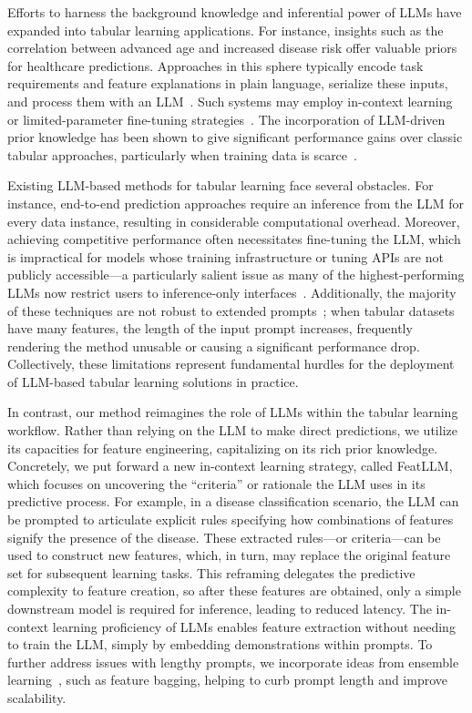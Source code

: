 Efforts to harness the background knowledge and inferential power of LLMs have expanded into tabular learning applications. For instance, insights such as the correlation between advanced age and increased disease risk offer valuable priors for healthcare predictions. Approaches in this sphere typically encode task requirements and feature explanations in plain language, serialize these inputs, and process them with an LLM~\cite{dinh2022lift,wang2023anypredict}. Such systems may employ in-context learning~\cite{nam2023semi} or limited-parameter fine-tuning strategies~\cite{dinh2022lift,hegselmann2023tabllm}. The incorporation of LLM-driven prior knowledge has been shown to give significant performance gains over classic tabular approaches, particularly when training data is scarce~\cite{hegselmann2023tabllm}.

Existing LLM-based methods for tabular learning face several obstacles. For instance, end-to-end prediction approaches require an inference from the LLM for every data instance, resulting in considerable computational overhead. Moreover, achieving competitive performance often necessitates fine-tuning the LLM, which is impractical for models whose training infrastructure or tuning APIs are not publicly accessible—a particularly salient issue as many of the highest-performing LLMs now restrict users to inference-only interfaces~\cite{anil2023palm,openai2023gpt4}. Additionally, the majority of these techniques are not robust to extended prompts~\cite{liu2023lost}; when tabular datasets have many features, the length of the input prompt increases, frequently rendering the method unusable or causing a significant performance drop. Collectively, these limitations represent fundamental hurdles for the deployment of LLM-based tabular learning solutions in practice.

In contrast, our method reimagines the role of LLMs within the tabular learning workflow. Rather than relying on the LLM to make direct predictions, we utilize its capacities for feature engineering, capitalizing on its rich prior knowledge. Concretely, we put forward a new in-context learning strategy, called \textsf{FeatLLM}, which focuses on uncovering the ``criteria'' or rationale the LLM uses in its predictive process. For example, in a disease classification scenario, the LLM can be prompted to articulate explicit rules specifying how combinations of features signify the presence of the disease. These extracted rules—or criteria—can be used to construct new features, which, in turn, may replace the original feature set for subsequent learning tasks. This reframing delegates the predictive complexity to feature creation, so after these features are obtained, only a simple downstream model is required for inference, leading to reduced latency. The in-context learning proficiency of LLMs enables feature extraction without needing to train the LLM, simply by embedding demonstrations within prompts. To further address issues with lengthy prompts, we incorporate ideas from ensemble learning~\cite{breiman2001random}, such as feature bagging, helping to curb prompt length and improve scalability.

